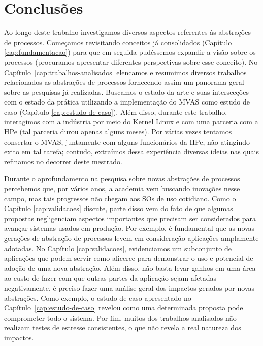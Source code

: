 \chapter{Conclusões}
\label{cap:conclusoes}

Ao longo deste trabalho investigamos diversos aspectos referentes às abstrações
de processos. Começamos revisitando conceitos já consolidados (Capítulo
\ref{cap:fundamentacao}) para que em seguida pudéssemos expandir a visão sobre
os processos (procuramos apresentar diferentes perspectivas sobre esse conceito).
No Capítulo~\ref{cap:trabalhos-analisados} elencamos e resumimos diversos
trabalhos relacionados as abstrações de processos fornecendo assim um panorama
geral sobre as pesquisas já realizadas. Buscamos o estado da arte e suas
intersecções com o estado da prática utilizando a implementação do MVAS como
estudo de caso (Capítulo \ref{cap:estudo-de-caso}). Além disso, durante este
trabalho, interagimos com a indústria por meio do Kernel Linux e com uma
parceria com a HPe (tal parceria durou apenas alguns meses). Por várias vezes
tentamos consertar o MVAS, juntamente com alguns funcionários da HPe, não
atingindo exito em tal tarefa; contudo, extraímos dessa experiência diversas
ideias nas quais refinamos no decorrer deste mestrado.

Durante o aprofundamento na pesquisa sobre novas abstrações de processos
percebemos que, por vários anos, a academia vem buscando inovações nesse campo,
mas tais progressos não chegam aos SOs de uso cotidiano. Como o Capítulo
\ref{cap:validacoes} discute, parte disso vem do fato de que algumas propostas
negligenciam aspectos importantes que precisam ser considerados para avançar
sistemas usados em produção. Por exemplo, é fundamental que as novas gerações
de abstração de processos levem em consideração aplicações amplamente adotadas.
No Capítulo \ref{cap:validacoes}, evidenciamos um subconjunto de aplicações que
podem servir como alicerce para demonstrar o uso e potencial de adoção de uma
nova abstração. Além disso, não basta levar ganhos em uma área ao custo de
fazer com que outras partes da aplicação sejam afetadas negativamente, é preciso
fazer uma análise geral dos impactos gerados por novas abstrações. Como
exemplo, o estudo de caso apresentado no Capítulo~\ref{cap:estudo-de-caso}
revelou como uma determinada proposta pode comprometer todo o sistema. Por
fim, muitos dos trabalhos analisados não realizam testes de estresse
consistentes, o que não revela a real natureza dos impactos.

